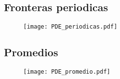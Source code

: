 \documentclass[11pt]{article}
\begin{document}
	\subsection{Fronteras periodicas}
		\begin{figure}[H]
    			\centering
    				\texttt{[image: PDE\_periodicas.pdf]}
    				\caption{}
    			\label{fig:periodicas}
		\end{figure}
	
	\subsection{Promedios}
		\begin{figure}[H]
    			\centering
    				\texttt{[image: PDE\_promedio.pdf]}
    				\caption{}
    			\label{fig:promedios}
		\end{figure}
	
\end{document}
